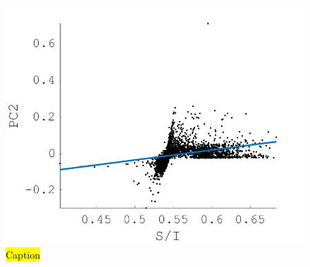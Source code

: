 \begin{figure}[htbp]
 \includegraphics[max width=\textwidth]{figs/comp/melcomp_3/21.png}
 \caption{\hl{Caption}}
 \label{fig:S/I-PC2}
\end{figure} 




